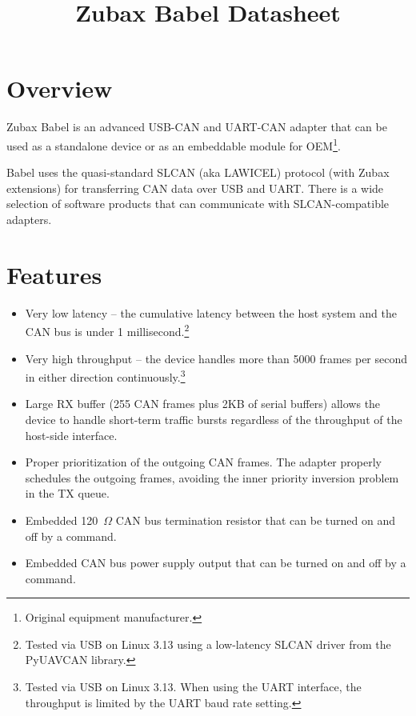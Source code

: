 \documentclass{zubaxdoc}
\title{Zubax Babel Datasheet}
\begin{document}
\frontmatter
\begin{titlepage}

\section*{Overview}

Zubax Babel is an advanced USB-\allowbreak{}CAN and UART-\allowbreak{}CAN adapter
that can be used as a standalone device or as an embeddable module for
OEM\footnote{Original equipment manufacturer.}.

Babel uses the quasi-standard SLCAN (aka LAWICEL) protocol (with Zubax extensions)
for transferring CAN data over USB and UART.
There is a wide selection of software products that can communicate with SLCAN-compatible adapters.

\section*{Features}

\begin{itemize}
    \item Very low latency -- the cumulative latency between the host system
          and the CAN bus is under 1 millisecond.\footnote{Tested via USB on Linux 3.13
          using a low-latency SLCAN driver from the PyUAVCAN library.}

    \item Very high throughput -- the device handles more than 5000 frames per second in either direction
          continuously.\footnote{Tested via USB on Linux 3.13.
          When using the UART interface, the throughput is limited by the UART baud rate setting.}

    \item Large RX buffer (255 CAN frames plus 2KB of serial buffers) allows the device to handle short-term
          traffic bursts regardless of the throughput of the host-side interface.

    \item Proper prioritization of the outgoing CAN frames.
          The adapter properly schedules the outgoing frames, avoiding the inner priority inversion problem
          in the TX queue.

    \item Embedded 120~$\Omega{}$ CAN bus termination resistor that can be turned on and off by a command.

    \item Embedded CAN bus power supply output that can be turned on and off by a command.


\end{itemize}
\end{titlepage}
\end{document}
